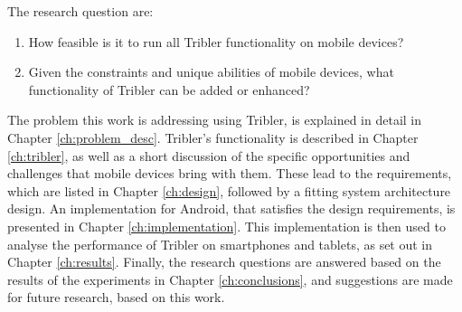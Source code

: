 The research question are:
\begin{enumerate}
	\item How feasible is it to run all Tribler functionality on mobile devices? %
	\item Given the constraints and unique abilities of mobile devices, what functionality of Tribler can be added or enhanced?
\end{enumerate}
The problem this work is addressing using Tribler, is explained in detail in Chapter \ref{ch:problem_desc}.
Tribler's functionality is described in Chapter \ref{ch:tribler}, as well as a short discussion of the specific opportunities and challenges that mobile devices bring with them.
These lead to the requirements, which are listed in Chapter \ref{ch:design}, followed by a fitting system architecture design.
An implementation for Android, that satisfies the design requirements, is presented in Chapter \ref{ch:implementation}.
This implementation is then used to analyse the performance of Tribler on smartphones and tablets, as set out in Chapter \ref{ch:results}.
Finally, the research questions are answered based on the results of the experiments in Chapter \ref{ch:conclusions}, and suggestions are made for future research, based on this work.

